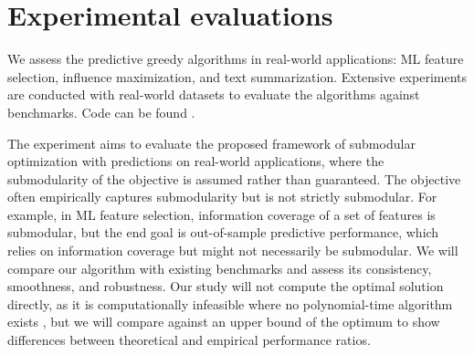 \section{Experimental evaluations} \label{sec:experiments}

We assess the predictive greedy algorithms in real-world applications: ML feature selection, influence maximization, and text summarization. Extensive experiments are conducted with real-world datasets to evaluate the algorithms against benchmarks. Code can be found \cite{anonymous2024submodularexperiment}. 

The experiment aims to evaluate the proposed framework of submodular optimization with predictions on real-world applications, where the submodularity of the objective is assumed rather than guaranteed. The objective often empirically captures submodularity but is not strictly submodular. For example, in ML feature selection, information coverage of a set of features is submodular, but the end goal is out-of-sample predictive performance, which relies on information coverage but might not necessarily be submodular. We will compare our algorithm with existing benchmarks and assess its consistency, smoothness, and robustness. Our study will not compute the optimal solution directly, as it is computationally infeasible where no polynomial-time algorithm exists \cite{setCoverisHard}, but we will compare against an upper bound of the optimum to show differences between theoretical and empirical performance ratios. 



